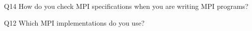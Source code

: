 \begin{description}%
\item{Q14} How do you check MPI specifications when you are writing MPI programs?%
\item{Q12} Which MPI implementations do you use?%
\end{description}%
